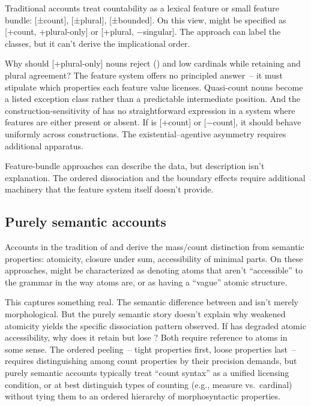 \documentclass[12pt,a4paper]{article}
\begin{document}
Traditional accounts treat countability as a lexical feature or small feature bundle: [±count], [±plural], [±bounded]. On this view,  might be specified as [+count, +plural-only] or [+plural, −singular]. The approach can label the classes, but it can't derive the implicational order.

Why should [+plural-only] nouns reject () and low cardinals while retaining  and plural agreement? The feature system offers no principled answer~-- it must stipulate which properties each feature value licenses. Quasi-count nouns become a listed exception class rather than a predictable intermediate position. And the construction-sensitivity of  has no straightforward expression in a system where features are either present or absent. If  is [+count] or [−count], it should behave uniformly across constructions. The existential--agentive asymmetry requires additional apparatus.

Feature-bundle approaches can describe the data, but description isn't explanation. The ordered dissociation and the boundary effects require additional machinery that the feature system itself doesn't provide.

\subsection{Purely semantic accounts}

Accounts in the tradition of \textcite{chierchia1998} and \textcite{rothstein2010} derive the mass/count distinction from semantic properties: atomicity, closure under sum, accessibility of minimal parts. On these approaches,  might be characterized as denoting atoms that aren't \enquote{accessible} to the grammar in the way  atoms are, or as having a \enquote{vague} atomic structure.

This captures something real. The semantic difference between  and  isn't merely morphological. But the purely semantic story doesn't explain why weakened atomicity yields the specific dissociation pattern observed. If  has degraded atomic accessibility, why does it retain  but lose ? Both require reference to atoms in some sense. The ordered peeling~-- tight properties first, loose properties last~-- requires distinguishing among count properties by their precision demands, but purely semantic accounts typically treat \enquote{count syntax} as a unified licensing condition, or at best distinguish types of counting (e.g., measure vs.\ cardinal) without tying them to an ordered hierarchy of morphosyntactic properties.
\end{document}
